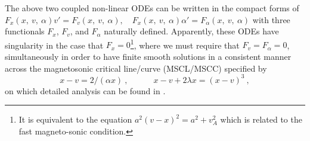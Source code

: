 \documentclass[fleqn,usenatbib]{mnras}
\begin{document}
The above two coupled non-linear ODEs can be written in the compact forms of $F_{x}(x,\ v,\ \alpha)v'=F_{v}(x,\ v,\ \alpha), \quad F_{x}(x,\ v,\ \alpha)\alpha'=F_{\alpha}(x,\ v,\ \alpha)$ with three functionals $F_x$, $F_{v}$, and $F_{\alpha}$ naturally defined. Apparently, these ODEs have singularity in the case that $F_{x}=0$\footnote{It is equivalent to the equation $a^{2}(v-x)^{2}=a^{2}+v_{A}^{2}$ which is related to the fast magneto-sonic condition.}, where we must require that $F_{v}=F_{\alpha}=0$, simultaneously in order to have finite smooth solutions in a consistent manner across the magnetosonic critical line/curve (MSCL/MSCC) specified by
\begin{equation}
 x-v=2/(\alpha x)\ , \qquad\quad
 x-v+2\lambda x=(x-v)^{3}\ ,\label{e13}
\end{equation}
on which detailed analysis can be found in \citet{yuLou2005}. 
\end{document}
